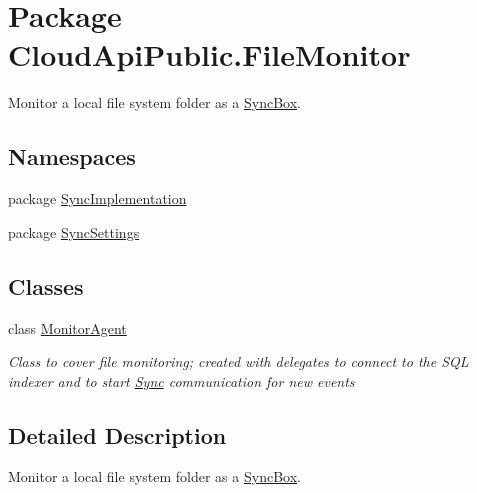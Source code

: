 \hypertarget{namespace_cloud_api_public_1_1_file_monitor}{\section{Package Cloud\-Api\-Public.\-File\-Monitor}
\label{namespace_cloud_api_public_1_1_file_monitor}
}


Monitor a local file system folder as a \hyperlink{namespace_cloud_api_public_1_1_sync_box}{Sync\-Box}.  


\subsection*{Namespaces}
\begin{DoxyCompactItemize}
\item 
package \hyperlink{namespace_cloud_api_public_1_1_file_monitor_1_1_sync_implementation}{Sync\-Implementation}
\item 
package \hyperlink{namespace_cloud_api_public_1_1_file_monitor_1_1_sync_settings}{Sync\-Settings}
\end{DoxyCompactItemize}
\subsection*{Classes}
\begin{DoxyCompactItemize}
\item 
class \hyperlink{class_cloud_api_public_1_1_file_monitor_1_1_monitor_agent}{Monitor\-Agent}
\begin{DoxyCompactList}\small\item\em Class to cover file monitoring; created with delegates to connect to the S\-Q\-L indexer and to start \hyperlink{namespace_cloud_api_public_1_1_sync}{Sync} communication for new events \end{DoxyCompactList}\end{DoxyCompactItemize}


\subsection{Detailed Description}
Monitor a local file system folder as a \hyperlink{namespace_cloud_api_public_1_1_sync_box}{Sync\-Box}. 